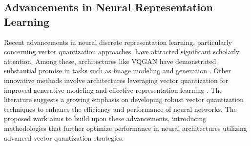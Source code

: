 \subsection{Advancements in Neural Representation Learning}
Recent advancements in neural discrete representation learning, particularly concerning vector quantization approaches, have attracted significant scholarly attention. Among these, architectures like VQGAN have demonstrated substantial promise in tasks such as image modeling and generation \cite{vqgan}. Other innovative methods involve architectures leveraging vector quantization for improved generative modeling \cite{vqvae} and effective representation learning \cite{dall_e}. The literature suggests a growing emphasis on developing robust vector quantization techniques to enhance the efficiency and performance of neural networks. The proposed work aims to build upon these advancements, introducing methodologies that further optimize performance in neural architectures utilizing advanced vector quantization strategies.



